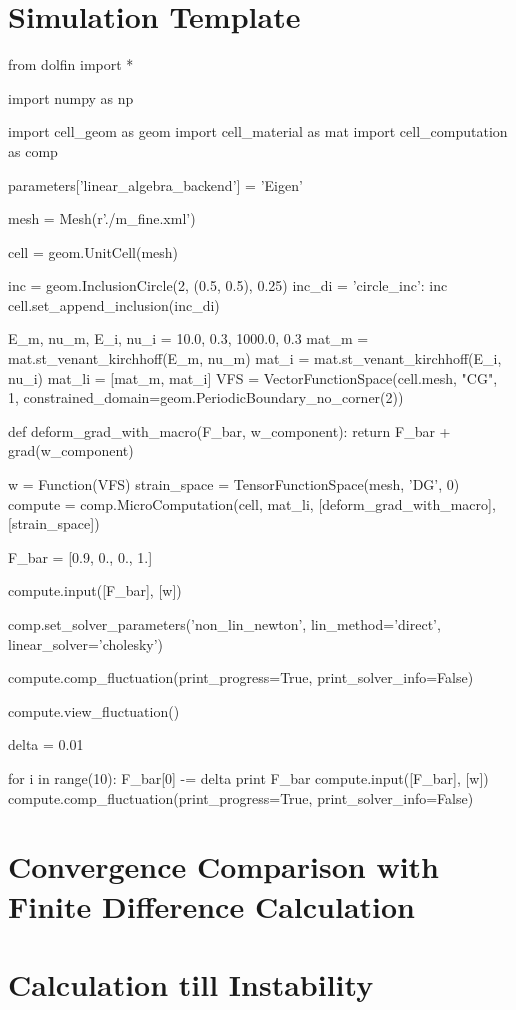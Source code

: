 \documentclass[10pt,a4paper]{scrreprt}
\begin{document}
\section{Simulation Template}
\begin{python}
from dolfin import *

import numpy as np

import cell_geom as geom
import cell_material as mat
import cell_computation as comp

parameters['linear_algebra_backend'] = 'Eigen'

mesh = Mesh(r'./m_fine.xml')

cell = geom.UnitCell(mesh)

inc = geom.InclusionCircle(2, (0.5, 0.5), 0.25)
inc_di = {'circle_inc': inc}
cell.set_append_inclusion(inc_di)

E_m, nu_m, E_i, nu_i = 10.0, 0.3, 1000.0, 0.3
mat_m = mat.st_venant_kirchhoff(E_m, nu_m)
mat_i = mat.st_venant_kirchhoff(E_i, nu_i)
mat_li = [mat_m, mat_i]
VFS = VectorFunctionSpace(cell.mesh, "CG", 1, 
                          constrained_domain=geom.PeriodicBoundary_no_corner(2))

def deform_grad_with_macro(F_bar, w_component):
    return F_bar + grad(w_component)

w = Function(VFS)
strain_space = TensorFunctionSpace(mesh, 'DG', 0)
compute = comp.MicroComputation(cell, mat_li, 
                                [deform_grad_with_macro],
                                [strain_space])

F_bar = [0.9, 0., 0., 1.]

compute.input([F_bar], [w])

comp.set_solver_parameters('non_lin_newton', lin_method='direct',
                      linear_solver='cholesky')


compute.comp_fluctuation(print_progress=True, print_solver_info=False)

compute.view_fluctuation()

delta = 0.01

for i in range(10):
    F_bar[0] -= delta
    print F_bar
    compute.input([F_bar], [w])
    compute.comp_fluctuation(print_progress=True, print_solver_info=False)
\end{python}

\section{Convergence Comparison with Finite Difference Calculation}

\section{Calculation till Instability}
\end{document}
